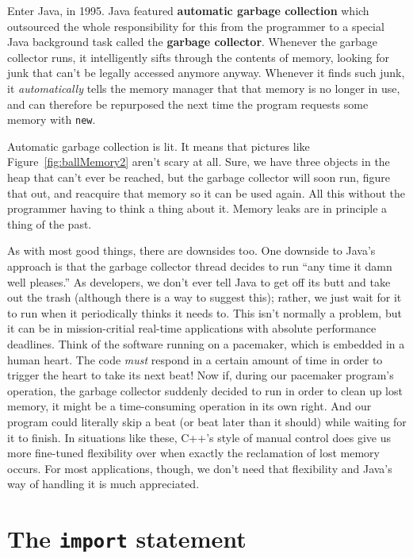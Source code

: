 Enter Java, in 1995. Java featured \textbf{automatic garbage collection} which
outsourced the whole responsibility for this from the programmer to a special
Java background task called the \textbf{garbage collector}. Whenever the
garbage collector runs, it intelligently sifts through the contents of memory,
looking for junk that can't be legally accessed anymore anyway. Whenever it
finds such junk, it \textit{automatically} tells the memory manager that that
memory is no longer in use, and can therefore be repurposed the next time the
program requests some memory with \texttt{new}.

Automatic garbage collection is lit. It means that pictures like
Figure~\ref{fig:ballMemory2} aren't scary at all. Sure, we have three objects
in the heap that can't ever be reached, but the garbage collector will soon
run, figure that out, and reacquire that memory so it can be used again. All
this without the programmer having to think a thing about it. Memory leaks are
in principle a thing of the past.

As with most good things, there are downsides too. One downside to Java's
approach is that the garbage collector thread decides to run ``any time it
damn well pleases.'' As developers, we don't ever tell Java to get off its butt
and take out the trash (although there is a way to suggest this); rather, we
just wait for it to run when it periodically thinks it needs to. This isn't
normally a problem, but it can be in mission-critial real-time applications
with absolute performance deadlines. Think of the software running on a
pacemaker, which is embedded in a human heart. The code \textit{must} respond
in a certain amount of time in order to trigger the heart to take its next
beat! Now if, during our pacemaker program's operation, the garbage collector
suddenly decided to run in order to clean up lost memory, it might be a
time-consuming operation in its own right. And our program could literally
skip a beat (or beat later than it should) while waiting for it to finish. In
situations like these, C++'s style of manual control does give us more
fine-tuned flexibility over when exactly the reclamation of lost memory
occurs. For most applications, though, we don't need that flexibility and
Java's way of handling it is much appreciated.

\section{The \texttt{import} statement}

